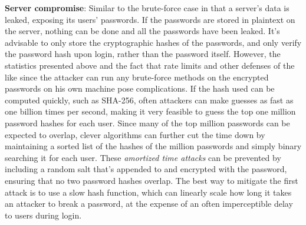 \documentclass{article}
\begin{document}
\textbf{Server compromise}: Similar to the brute-force case in that a server's data is leaked, exposing its users' passwords. If the passwords are stored in plaintext on the server, nothing can be done and all the passwords have been leaked. It's advisable to only store the cryptographic hashes of the passwords, and only verify the password hash upon login, rather than the password itself. However, the statistics presented above and the fact that rate limits and other defenses of the like since the attacker can run any brute-force methods on the encrypted passwords on his own machine pose complications. If the hash used can be computed quickly, such as SHA-256, often attackers can make guesses as fast as one billion times per second, making it very feasible to guess the top one million password hashes for each user. Since many of the top million passwords can be expected to overlap, clever algorithms can further cut the time down by maintaining a sorted list of the hashes of the million passwords and simply binary searching it for each user. These \textit{amortized time attacks} can be prevented by including a random salt that's appended to and encrypted with the password, ensuring that no two password hashes overlap. The best way to mitigate the first attack is to use a slow hash function, which can linearly scale how long it takes an attacker to break a password, at the expense of an often imperceptible delay to users during login.
\end{document}
